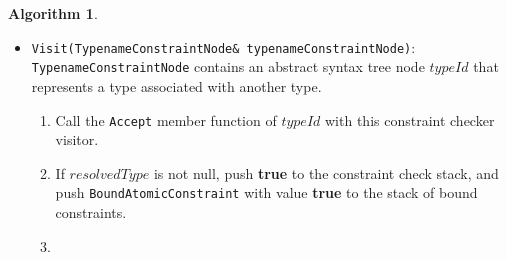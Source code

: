 \documentclass[a4paper,oneside,11pt]{book}
\theoremstyle{definition}
\newtheorem{algo}{Algorithm}[section]
\begin{document}
\begin{algo}
\begin{itemize}
\begin{enumerate}
\begin{enumerate}
\begin{enumerate}
\item
Let $t$ be a $i$'th type expression of the multiParamConstraintNode.
\item
Call the \verb|Accept| member function of $t$ with this constraint checker visitor.
\item
If $resolvedType$ is not null, add $resolvedType $ to $a$.
\item
Otherwise report error.
\end{enumerate}
\item
Compute a 16-byte $conceptId$ using algorithm \ref{computeconceptid} for the concept symbol $s$ and list of type arguments $a$.
\item
Lookup $conceptId$ from the concept repository (section \ref{conceptrepository}).
\item
If found, push \textbf{true} to the constraint check stack,
push a bound constraint cloned from the bound constraint contained by the instantiated concept, and return.
\item
Otherwise, instantiate concept $s$ with type arguments $a$ using algorithm \ref{instantiateconcept}.
Let $c$ be the instantiated concept.
\item
If $c$ is not null, add $c$ to the concept repository with id $conceptId$, and push \textbf{true} to the constraint check stack,
and push bound constraint corresponding to $c$ to the stack of bound constraints.
\item
Otherwise, push \textbf{false} to the constraint check stack and push \verb|BoundAtomicConstraint|
with value \textbf{false} to the stack of bound constraints.
\end{enumerate}
\item
Otherwise report error.
\end{enumerate}
\item
\verb|Visit(TypenameConstraintNode& typenameConstraintNode)|:\\
\verb|TypenameConstraintNode| contains an abstract syntax tree node $typeId$ that represents a type associated with another type.
\begin{enumerate}
\item
Call the \verb|Accept| member function of $typeId$ with this constraint checker visitor.
\item
If $resolvedType$ is not null, push \textbf{true} to the constraint check stack, and
push \verb|BoundAtomicConstraint| with value \textbf{true} to the stack of bound constraints.
\item

\end{enumerate}
\end{itemize}
\end{algo}
\end{document}
